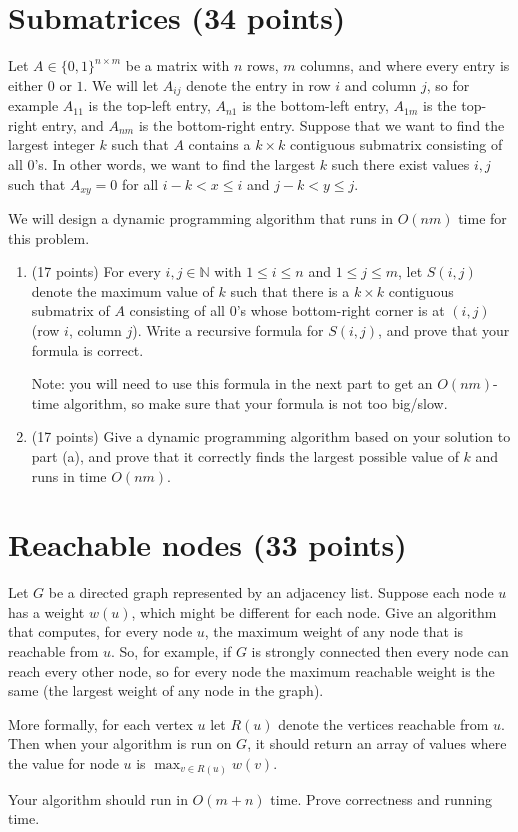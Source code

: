 \documentclass[11pt]{article}
\begin{document}
  
 
   
   

\section{Submatrices (34 points)}


Let $A \in \{0,1\}^{n \times m}$ be a matrix with $n$ rows, $m$ columns, and where every entry is either $0$ or $1$.  We will let $A_{ij}$ denote the entry in row $i$ and column $j$, so for example $A_{11}$ is the top-left entry, $A_{n1}$ is the bottom-left entry, $A_{1m}$ is the top-right entry, and $A_{nm}$ is the bottom-right entry.  Suppose that we want to find the largest integer $k$ such that $A$ contains a $k \times k$ contiguous submatrix consisting of all $0$'s.  In other words, we want to find the largest $k$ such there exist values $i,j$ such that $A_{xy} = 0$ for all $i-k < x \leq i$ and $j-k < y \leq j$.  

We will design a dynamic programming algorithm that runs in $O(nm)$ time for this problem.  

\begin{enumerate}
\item (17 points) For every $i,j \in \mathbb{N}$ with $1 \leq i \leq n$ and $1 \leq j \leq m$, let $S(i,j)$ denote the maximum value of $k$ such that there is a $k \times k$ contiguous submatrix of $A$ consisting of all $0$'s whose bottom-right corner is at $(i,j)$ (row $i$, column $j$).  Write a recursive formula for $S(i,j)$, and prove that your formula is correct.  

Note: you will need to use this formula in the next part to get an $O(nm)$-time algorithm, so make sure that your formula is not too big/slow.

\item (17 points) Give a dynamic programming algorithm based on your solution to part (a), and prove that it correctly finds the largest possible value of $k$ and runs in time $O(nm)$.

\end{enumerate}




\section{Reachable nodes (33 points)}
Let $G$ be a directed graph represented by an adjacency list.  Suppose each node $u$ has a weight $w(u)$, which might be different for each node.  Give an algorithm that computes, for every node $u$, the maximum weight of any node that is reachable from $u$.  So, for example, if $G$ is strongly connected then every node can reach every other node, so for every node the maximum reachable weight is the same (the largest weight of any node in the graph).  

More formally, for each vertex $u$ let $R(u)$ denote the vertices reachable from $u$.  Then when your algorithm is run on $G$, it should return an array of values where the value for node $u$ is $\max_{v \in R(u)} w(v)$.

Your algorithm should run in $O(m+ n)$ time.  Prove correctness and running time.
\end{document}
